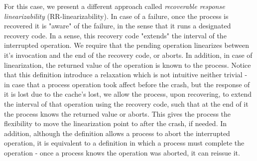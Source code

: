 \documentclass{article}
\begin{document}
For this case, we present a different approach called \emph{recoverable response linearizability} (RR-linearizability). In case of a failure, once the process is recovered it is "aware" of the failure, in the sense that it runs a designated recovery code. In a sense, this recovery code "extends" the interval of the interrupted operation. We require that the pending operation linearizes between it's invocation and the end of the recovery code, or aborts. In addition, in case of linearization, the returned value of the operation is known to the process. Notice that this definition introduce a relaxation which is not intuitive neither trivial - in case that a process operation took affect before the crash, but the response of it is lost due to the cache's lost, we allow the process, upon recovering, to extend the interval of that operation using the recovery code, such that at the end of it the process knows the returned value or aborts. This gives the process the flexibility to move the linearization point to after the crash, if needed. In addition, although the definition allows a process to abort the interrupted operation, it is equivalent to a definition in which a process must complete the operation - once a process knows the operation was aborted, it can reissue it.


\iffalse
Progress properties are formally defined using histories. We follow [*] for these definitions. There are four types of steps: (1) an invocation step, denoted $(INV, p, X, op)$, represents the invocation by process $p$ of operation $op$ on implemented object $X$; (2) a response step, denoted $(RES, p, X, ret)$, represents the completion by process $p$ of the last operation it invoked on object $X$, with response $ret$; (3) a crash step, denoted $(CRASH, p)$, denotes a crash of process $p$; (4) a recovery step, denoted $(REC, p)$, denotes a recovery of process $p$;

A history $H$ is a sequence of steps, possibly involving multiple processes and implemented objects. For a given history $H$, we denote by $H \mid p$ the projection of $H$ onto the steps of process $p$. Similarly, we denote by $H \mid O$ the projection of $H$ onto the steps involving implemented object $O$. We adopt the convention that both $H \mid p$ and $H \mid O$ retain all crash steps in $H$. A response step is \emph{matching} with respect to an invocation step $s$ by a process $p$ on object $X$ in a history $H$ if it is the first response step by $p$ on $X$ that follows $s$ in $H$, and it occurs before p’s next invocation (if any) in $H$.
\fi
\end{document}
